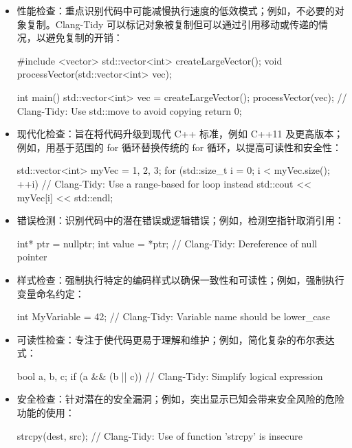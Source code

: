 \begin{itemize}
\item
性能检查：重点识别代码中可能减慢执行速度的低效模式；例如，不必要的对象复制。Clang-Tidy 可以标记对象被复制但可以通过引用移动或传递的情况，以避免复制的开销：

\begin{cpp}
#include <vector>
std::vector<int> createLargeVector();
void processVector(std::vector<int> vec);

int main() {
    std::vector<int> vec = createLargeVector();
    processVector(vec); // Clang-Tidy: Use std::move to avoid copying
    return 0;
}
\end{cpp}

\item
现代化检查：旨在将代码升级到现代 C++ 标准，例如 C++11 及更高版本；例如，用基于范围的 for 循环替换传统的 for 循环，以提高可读性和安全性：

\begin{cpp}
std::vector<int> myVec = {1, 2, 3};
for (std::size_t i = 0; i < myVec.size(); ++i) {
    // Clang-Tidy: Use a range-based for loop instead
    std::cout << myVec[i] << std::endl;
}
\end{cpp}

\item
错误检测：识别代码中的潜在错误或逻辑错误；例如，检测空指针取消引用：

\begin{cpp}
int* ptr = nullptr;
int value = *ptr; // Clang-Tidy: Dereference of null pointer
\end{cpp}

\item
样式检查：强制执行特定的编码样式以确保一致性和可读性；例如，强制执行变量命名约定：

\begin{cpp}
int MyVariable = 42; // Clang-Tidy: Variable name should be lower_case
\end{cpp}

\item
可读性检查：专注于使代码更易于理解和维护；例如，简化复杂的布尔表达式：

\begin{cpp}
bool a, b, c;
if (a && (b || c)) {
    // Clang-Tidy: Simplify logical expression
}
\end{cpp}

\item
安全检查：针对潜在的安全漏洞；例如，突出显示已知会带来安全风险的危险功能的使用：

\begin{cpp}
strcpy(dest, src); // Clang-Tidy: Use of function 'strcpy' is insecure
\end{cpp}

\end{itemize}


